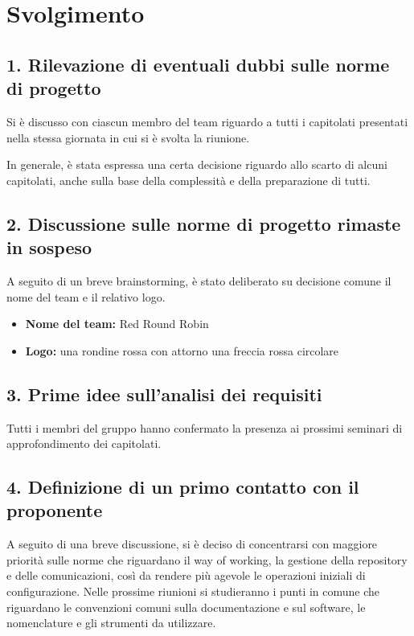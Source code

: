 \newpage
\section*{Svolgimento}

\subsection*{1. Rilevazione di eventuali dubbi sulle norme di progetto}

Si è discusso con ciascun membro del team riguardo a tutti i capitolati presentati nella stessa giornata in cui si è svolta la riunione. 

In generale, è stata espressa una certa decisione riguardo allo scarto di alcuni capitolati, anche sulla base della complessità e della preparazione di tutti.

\subsection*{2. Discussione sulle norme di progetto rimaste in sospeso}

A seguito di un breve brainstorming, è stato deliberato su decisione comune il nome del team e il relativo logo.

\begin{itemize}
	\item \textbf{Nome del team:} Red Round Robin
	\item \textbf{Logo:} una rondine rossa con attorno una freccia rossa circolare
\end{itemize}

\subsection*{3. Prime idee sull'analisi dei requisiti}

Tutti i membri del gruppo hanno confermato la presenza ai prossimi seminari di approfondimento dei capitolati.

\subsection*{4. Definizione di un primo contatto con il proponente}

A seguito di una breve discussione, si è deciso di concentrarsi con maggiore priorità sulle norme che riguardano il way of working, la gestione della repository e delle comunicazioni, così da rendere più agevole le operazioni iniziali di configurazione.
Nelle prossime riunioni si studieranno i punti in comune che riguardano le convenzioni comuni sulla documentazione e sul software, le nomenclature e gli strumenti da utilizzare. 

